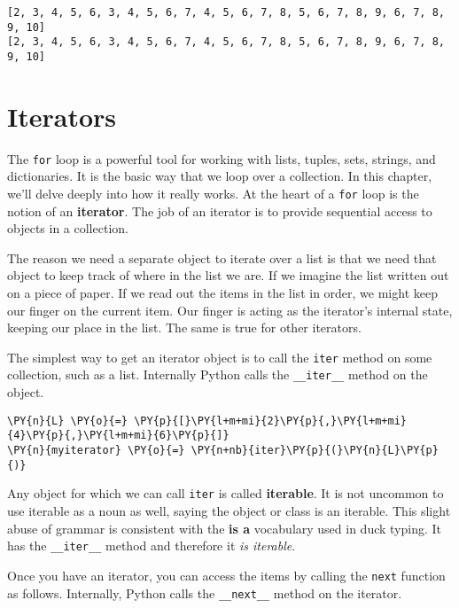 \begin{Verbatim}
[2, 3, 4, 5, 6, 3, 4, 5, 6, 7, 4, 5, 6, 7, 8, 5, 6, 7, 8, 9, 6, 7, 8, 9, 10]
[2, 3, 4, 5, 6, 3, 4, 5, 6, 7, 4, 5, 6, 7, 8, 5, 6, 7, 8, 9, 6, 7, 8, 9, 10]

\end{Verbatim}

\section{Iterators}


The \texttt{for} loop is a powerful tool for working with lists, tuples, sets, strings, and dictionaries.
It is the basic way that we loop over a collection.
In this chapter, we’ll delve deeply into how it really works.
At the heart of a \texttt{for} loop is the notion of an \textbf{iterator}.
The job of an iterator is to provide sequential access to objects in a collection.


The reason we need a separate object to iterate over a list is that we need that object to keep track of where in the list we are.  If we imagine the list written out on a piece of paper.  If we read out the items in the list in order, we might keep our finger on the current item.  Our finger is acting as the iterator’s internal state, keeping our place in the list.  The same is true for other iterators.


The simplest way to get an iterator object is to call the \texttt{iter} method on some collection, such as a list.  Internally Python calls the \texttt{\_\_iter\_\_} method on the object.

\begin{Verbatim}[commandchars=\\\{\}]
\PY{n}{L} \PY{o}{=} \PY{p}{[}\PY{l+m+mi}{2}\PY{p}{,}\PY{l+m+mi}{4}\PY{p}{,}\PY{l+m+mi}{6}\PY{p}{]}
\PY{n}{myiterator} \PY{o}{=} \PY{n+nb}{iter}\PY{p}{(}\PY{n}{L}\PY{p}{)}
\end{Verbatim}



Any object for which we can call \texttt{iter} is called \textbf{iterable}.  It is not uncommon to use iterable as a noun as well, saying the object or class is an iterable.  This slight abuse of grammar is consistent with the \textbf{is a} vocabulary used in duck typing.  It has the \texttt{\_\_iter\_\_} method and therefore it \emph{is iterable}.


Once you have an iterator, you can access the items by calling the \texttt{next} function as follows.  Internally, Python calls the \texttt{\_\_next\_\_} method on the iterator.


